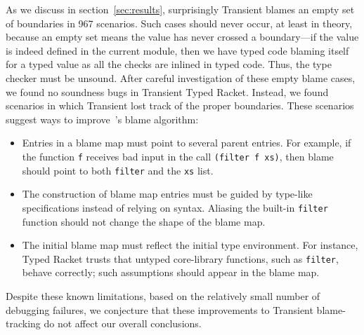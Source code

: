 As we discuss in section~\ref{sec:results}, surprisingly Transient blames
an empty set of boundaries in 967 scenarios.
Such cases should never occur, at least in theory, because an empty set
 means the value has never crossed a boundary---if the value is indeed defined
 in the current module, then we have typed code blaming itself for a typed
 value as all the checks are inlined in typed code. Thus, the type checker must be unsound.
After careful investigation of these empty blame cases, we found no soundness
 bugs in Transient Typed Racket.
Instead, we found scenarios in which Transient lost track of the proper
 boundaries.
These scenarios suggest ways to improve~\citet{vss-popl-2017}'s blame
algorithm:
\begin{itemize}
  \item
    Entries in a blame map must point to several parent entries.
    For example, if the function \texttt{f} receives bad input in the call
    \texttt{(filter f xs)}, then blame should point to both \texttt{filter}
    and the \texttt{xs} list.
  \item
    The construction of blame map entries must be guided by type-like specifications
     instead of relying on syntax.
    Aliasing the built-in \texttt{filter} function should not change the shape
     of the blame map.
  \item
    The initial blame map must reflect the initial type environment.
    For instance, Typed Racket trusts that untyped core-library functions, such as \texttt{filter},
     behave correctly; such assumptions should appear in the blame map.
\end{itemize}
\noindent{}Despite these known limitations, based on the relatively small
number of debugging failures, we conjecture that these improvements
 to Transient blame-tracking do not affect our overall conclusions.

